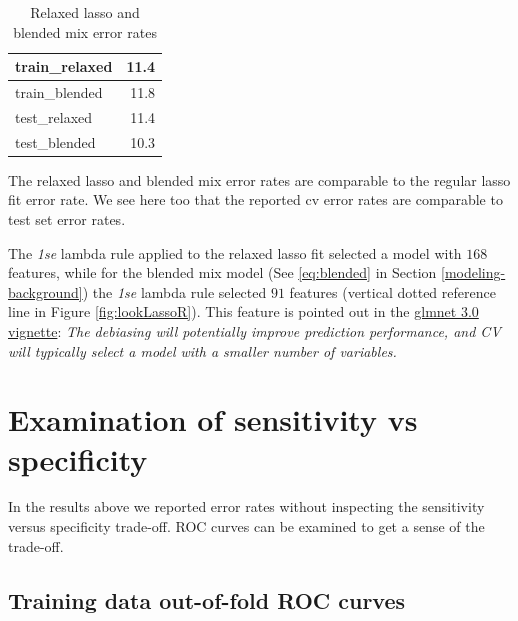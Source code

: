 \documentclass[
]{book}
\begin{document}
\begin{table}

\caption{\label{tab:brcaRna-glmnetFit-lookLassoR2}Relaxed lasso and blended mix error rates}
\centering
\begin{tabular}[t]{l|r}
\hline
train\_relaxed & 11.4\\
\hline
train\_blended & 11.8\\
\hline
test\_relaxed & 11.4\\
\hline
test\_blended & 10.3\\
\hline
\end{tabular}
\end{table}

The relaxed lasso and blended mix error rates are comparable to the
regular lasso fit error rate. We see here too that the reported cv
error rates are comparable to test set error rates.

The \emph{1se} lambda rule applied to the relaxed lasso fit selected a model with
\(168\) features,
while for the blended mix model
(See \eqref{eq:blended} in Section \ref{modeling-background})
the \emph{1se} lambda rule selected
\(91\) features (vertical
dotted reference line in Figure \ref{fig:lookLassoR}).
This feature is pointed out in the
\href{https://cran.r-project.org/web/packages/glmnet/vignettes/relax.pdf}{glmnet 3.0 vignette}:
\emph{The debiasing will potentially improve prediction performance,
and CV will typically select a model with a smaller number of variables.}

\hypertarget{examination-of-sensitivity-vs-specificity-1}{%
\section{Examination of sensitivity vs specificity}\label{examination-of-sensitivity-vs-specificity-1}}

In the results above we reported error rates without inspecting the
sensitivity versus specificity trade-off. ROC curves can be examined
to get a sense of the trade-off.

\hypertarget{training-data-out-of-fold-roc-curves-1}{%
\subsection{Training data out-of-fold ROC curves}\label{training-data-out-of-fold-roc-curves-1}}
\end{document}
